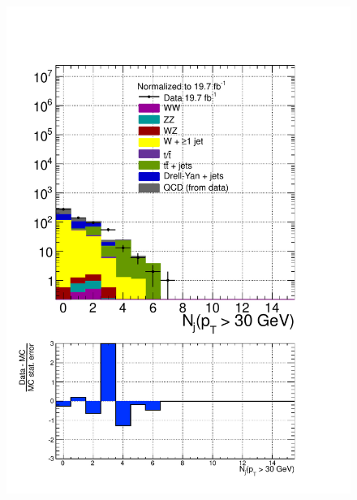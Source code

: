 \begin{figure}[hbtp]
  \begin{center}
    \includegraphics[width=\cmsFigWidth]{figures/dataVsMCQCD_nAddlJetsPTGeq30_lowMT_v87}

\end{center}
\end{figure}
